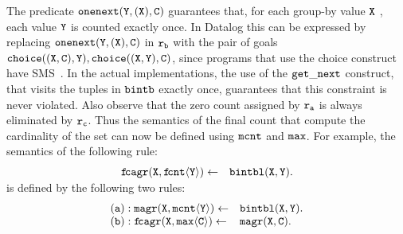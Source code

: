 \documentclass[11pt]{article}
\def\mt{\tt}
\newcommand{\cldl}{\[\begin{array}{ll}}
\newcommand{\eldl}{\end{array}\]\rm}
\newcommand{\prule}[2]{ \mt #1 \leftarrow & \mt #2 \\}
\def\inv{\vspace{-0.2cm}}
\def\sinv{\vspace{-0.1cm}}
\def\inv{\vspace{-0.2cm}}
\def\sinv{\vspace{-0.1cm}}
\def\rof#1{$\tt r_{#1}$}
\def\prem{$\cal P$$\!reM$~}
\begin{document}
 The predicate  $\tt onenext(Y, (X), C)$ guarantees that, for each group-by value $\tt X$ , each 
value $\tt Y$ is counted exactly once. In Datalog  this can be expressed by replacing 
 $\tt onenext(Y, (X), C)$  in \rof{b} with the pair of goals $ \tt choice((X,C), Y), choice((X, Y), C)$,
since programs that use the choice construct have SMS~\cite{DBLP:conf/pods/GrecoZG92}.
 In the actual implementations,  the use of the  $\tt get\_next$ construct, that visits the tuples in $\tt bintb$
exactly once,  guarantees that this constraint is never violated. Also observe that the zero count assigned
by \rof{a} is  always eliminated by \rof{c}. Thus the  semantics of the final count that compute the 
cardinality of the set can now be defined using $\tt mcnt$ and $\tt max$. For example, the semantics of the following rule:
\inv \cldl
\prule{f\!cagr(X, f\!cnt\langle Y \rangle)} {bintbl(X, Y).\inv}
\eldl
\inv is defined by the following two rules:
\cldl
\prule{(a): magr(X, mcnt\langle Y \rangle)} {bintbl(X, Y).}
\prule{(b): f\!cagr(X, max\langle C \rangle)} { magr(X, C).\sinv}
\eldl
\end{document}

